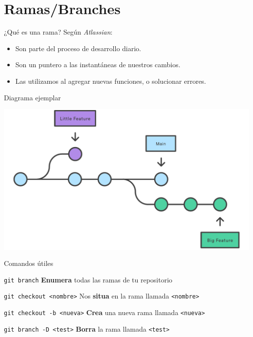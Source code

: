 \documentclass{beamer}
\begin{document}
    \section{Ramas/Branches}
    \begin{frame}{¿Qué es una rama?}
        Según \textit{Atlassian}:\pause
        \begin{itemize}
            \item Son parte del proceso de desarrollo diario.\pause
            \item Son un puntero a las instantáneas de nuestros cambios.\pause
            \item Las utilizamos al agregar nuevas funciones, o solucionar errores.
        \end{itemize}
    \end{frame}
    \begin{frame}{Diagrama ejemplar}
        \begin{center}
            \includegraphics[width=\textwidth]{01 Git branch.pdf}
        \end{center}
    \end{frame}
    \begin{frame}{Comandos útiles}
        \begin{block}{\texttt{git branch}}
            \textbf{Enumera} todas las ramas de tu repositorio
        \end{block}\pause
        \begin{block}{\texttt{git checkout <nombre>}}
            Nos \textbf{situa} en la rama llamada \texttt{<nombre>}
        \end{block}\pause
        \begin{block}{\texttt{git checkout -b <nueva>}}
            \textbf{Crea} una nueva rama llamada \texttt{<nueva>}
        \end{block}\pause
        \begin{block}{\texttt{git branch -D <test>}}
            \textbf{Borra} la rama llamada \texttt{<test>}
        \end{block}
    \end{frame}
    
\end{document}
